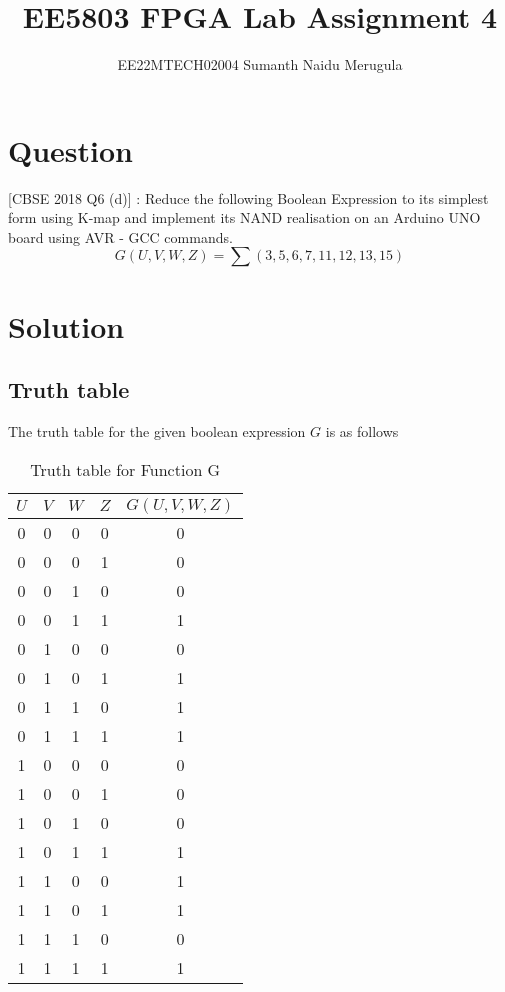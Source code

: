 \documentclass[14pt]{article}
\title{EE5803 FPGA Lab Assignment 4}
\author{EE22MTECH02004  Sumanth Naidu Merugula}
\begin{document}
\maketitle
\section{Question}
[CBSE 2018 Q6 (d)] : Reduce the following Boolean Expression to its simplest form using K-map and implement its NAND realisation on an Arduino UNO board using AVR - GCC commands.  
\begin{equation}
G(U,V,W,Z)=\sum(3,5,6,7,11,12,13,15) 
\end{equation}
\section{Solution}
\subsection{Truth table}
The truth table for the given boolean expression $G$ is as follows
\begin{table}[h!]
\centering
\begin{tabular}{|c|c|c|c|c|} 
\hline
$U$ & $V$ & $W$  & $Z$ & $G(U,V,W,Z)$  \\ 
\hline
0 & 0 & 0 & 0 & 0     \\ 
\hline
0 & 0 & 0 & 1 & 0     \\ 
\hline
0 & 0 & 1 & 0 & 0     \\ 
\hline
0 & 0 & 1 & 1 & 1     \\ 
\hline
0 & 1 & 0 & 0 & 0     \\ 
\hline
0 & 1 & 0 & 1 & 1     \\ 
\hline
0 & 1 & 1 & 0 & 1     \\ 
\hline
0 & 1 & 1 & 1 & 1     \\ 
\hline
1 & 0 & 0 & 0 & 0     \\ 
\hline
1 & 0 & 0 & 1 & 0     \\ 
\hline
1 & 0 & 1 & 0 & 0     \\ 
\hline
1 & 0 & 1 & 1 & 1     \\ 
\hline
1 & 1 & 0 & 0 & 1     \\ 
\hline
1 & 1 & 0 & 1 & 1     \\ 
\hline
1 & 1 & 1 & 0 & 0     \\ 
\hline
1 & 1 & 1 & 1 & 1     \\ 
\hline
\end{tabular}
\caption{Truth table for Function G}
\end{table}
\end{document}
